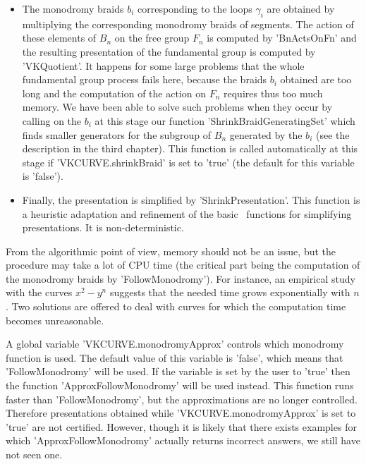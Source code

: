 \begin{itemize}
\item The monodromy  braids $b_i$ corresponding to  the loops $\gamma_i$
are  obtained  by  multiplying  the corresponding  monodromy  braids  of
segments. The action of these elements  of $B_n$ on the free group $F_n$
is  computed  by 'BnActsOnFn'  and  the  resulting presentation  of  the
fundamental group is computed by 'VKQuotient'. It happens for some large
problems that  the whole fundamental  group process fails  here, because
the braids $b_i$ obtained are too long and the computation of the action
on $F_n$ requires thus too much memory.  We have been able to solve such
problems  when they  occur by  calling on  the $b_i$  at this  stage our
function 'ShrinkBraidGeneratingSet'  which finds smaller  generators for
the subgroup of $B_n$ generated by the $b_i$ (see the description in the
third chapter). This  function is called automatically at  this stage if
'VKCURVE.shrinkBraid' is set to 'true' (the default for this variable is
'false').

\item Finally,  the presentation is simplified  by 'ShrinkPresentation'.
This  function is  a heuristic  adaptation and  refinement of  the basic
\GAP\ functions for simplifying presentations. It is non-deterministic.

\end{itemize}

From the algorithmic  point of view, memory should not  be an issue, but
the procedure may  take a lot of  CPU time (the critical  part being the
computation of the monodromy braids by 'FollowMonodromy'). For instance,
an empirical  study with the  curves $x^2-y^n$ suggests that  the needed
time grows  exponentially with  $n$. Two solutions  are offered  to deal
with curves for which the computation time becomes unreasonable.

A   global  variable  'VKCURVE.monodromyApprox'  controls  which  monodromy
function  is used.  The default  value of  this variable  is 'false', which
means  that 'FollowMonodromy' will be  used. If the variable  is set by the
user  to  'true'  then  the  function  'ApproxFollowMonodromy' will be used
instead.   This  function  runs  faster  than  'FollowMonodromy',  but  the
approximations  are no longer  controlled. Therefore presentations obtained
while  'VKCURVE.monodromyApprox'  is  set  to  'true'  are  not  certified.
However,  though  it  is  likely  that  there  exists  examples  for  which
'ApproxFollowMonodromy'  actually returns incorrect  answers, we still have
not seen one.

